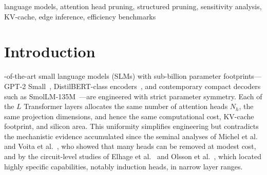 \documentclass[10pt,journal,compsoc]{IEEEtran}
\begin{document}
\begin{abstract}
beyond which degradation is steep: at 30\% global excision GPT-2 Small perplexity
rises from 36.6757 to 55.6953 ($+51.9\%$). A four-way paradigm ablation shows the
sensitivity ranking dominates at equal sparsity: Taylor (55.6953) outperforms the
L2 weight-norm heuristic (641.1694) and the five-seed random control
(270.7793$\pm$155.3170). Physically excised checkpoints reduce decode latency by
up to 18.2\% ($B{=}1$) on CPU and the Theorem-3 KV-cache footprint by exactly 33.3\%
($B{=}8$, $T{=}1024$, fp16), while two CUDA replications measure wall-clock
decode parity with the same exact memory reduction.
A complete seven-model matrix on an RTX PRO 6000 Blackwell GPU (fp16, 30\%
excision; GPT-2 Small/Medium, OPT-125M~\cite{zhang2022opt},
Pythia-160M/410M~\cite{biderman2023pythia}, SmolLM-135M,
Qwen2.5-0.5B~\cite{qwen2025qwen25}) widens the unrepaid envelope to 13--92\%,
measures a two-epoch repayment recovering 15--57\% of the damage (over
100\% at 10\% excision), and shows GQA KV sharing capping Qwen2.5-0.5B's
cache cut at 16.7\% measured versus 29.2\% theoretical.
The study contributes an exact, repayment-free, audit-traceable methodology and
demonstrates that measured sensitivity geometry---not structural symmetry---should
govern non-uniform head allocation for on-device SLM deployment.
\end{abstract}

\begin{IEEEkeywords}
language models, attention head pruning, structured pruning, sensitivity analysis,
KV-cache, edge inference, efficiency benchmarks
\end{IEEEkeywords}

\section{Introduction}
-of-the-art small language models (SLMs) with sub-billion
parameter footprints---GPT-2 Small~\cite{radford2019language}, DistilBERT-class
encoders~\cite{sanh2019distilbert}, and contemporary compact decoders such as
SmolLM-135M~\cite{allal2025smollm}---are engineered with strict parameter symmetry.
Each of the $L$ Transformer layers allocates the same number of attention heads
$N_h$, the same projection dimensions, and hence the same computational cost,
KV-cache footprint, and silicon area. This uniformity simplifies engineering but
contradicts the mechanistic evidence accumulated since the seminal analyses of
Michel et al.~\cite{michel2019sixteen} and Voita et al.~\cite{voita2019analyzing}, who
showed that many heads can be removed at modest cost, and by the circuit-level
studies of Elhage et al.~\cite{elhage2021mathematical} and
Olsson et al.~\cite{olsson2022context}, which located highly specific capabilities,
notably induction heads, in narrow layer ranges.
\end{document}
